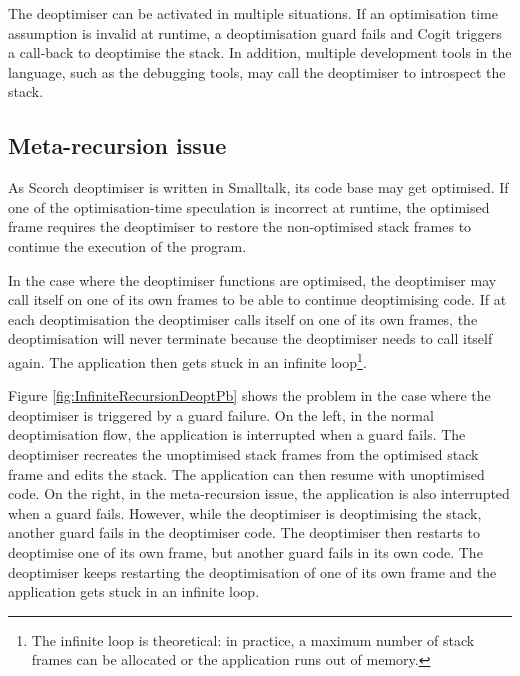 \documentclass[a4paper,12pt,twoside]{../includes/ThesisStyle}
\begin{document}
The deoptimiser can be activated in multiple situations. If an optimisation time assumption is invalid at runtime, a deoptimisation guard fails and Cogit triggers a call-back to deoptimise the stack. In addition, multiple development tools in the language, such as the debugging tools, may call the deoptimiser to introspect the stack.

\subsection{Meta-recursion issue}

As Scorch deoptimiser is written in Smalltalk, its code base may get optimised. If one of the optimisation-time speculation is incorrect at runtime, the optimised frame requires the deoptimiser to restore the non-optimised stack frames to continue the execution of the program. 

In the case where the deoptimiser functions are optimised, the deoptimiser may call itself on one of its own frames to be able to continue deoptimising code. If at each deoptimisation the deoptimiser calls itself on one of its own frames, the deoptimisation will never terminate because the deoptimiser needs to call itself again. The application then gets stuck in an infinite loop\footnote{The infinite loop is theoretical: in practice, a maximum number of stack frames can be allocated or the application runs out of memory.}.

Figure \ref{fig:InfiniteRecursionDeoptPb} shows the problem in the case where the deoptimiser is triggered by a guard failure. On the left, in the normal deoptimisation flow, the application is interrupted when a guard fails. The deoptimiser recreates the unoptimised stack frames from the optimised stack frame and edits the stack. The application can then resume with unoptimised code. On the right, in the meta-recursion issue, the application is also interrupted when a guard fails. However, while the deoptimiser is deoptimising the stack, another guard fails in the deoptimiser code. The deoptimiser then restarts to deoptimise one of its own frame, but another guard fails in its own code. The deoptimiser keeps restarting the deoptimisation of one of its own frame and the application gets stuck in an infinite loop.
\end{document}

